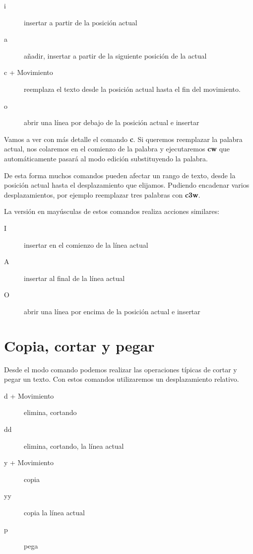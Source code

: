 \begin{description}
    \item[i] insertar a partir de la posición actual
    \item[a] añadir, insertar a partir de la siguiente posición de la actual
    \item[c + Movimiento] reemplaza el texto desde la posición actual hasta el
    fin del movimiento.
    \item[o] abrir una línea por debajo de la posición actual e insertar 
\end{description}

Vamos a ver con más detalle el comando \textbf{c}. Si queremos reemplazar la
palabra actual, nos colaremos en el comienzo de la palabra y ejecutaremos
\textbf{cw} que automáticamente pasará al modo edición substituyendo la
palabra.

De esta forma muchos comandos pueden afectar un rango de texto, desde la
posición actual hasta el desplazamiento que elijamos. Pudiendo encadenar varios
desplazamientos, por ejemplo reemplazar tres palabras con \textbf{c3w}.

La versión en mayúsculas de estos comandos realiza acciones similares:

\begin{description}
    \item[I] insertar en el comienzo de la línea actual
    \item[A] insertar al final de la línea actual
    \item[O] abrir una línea por encima de la posición actual e insertar
\end{description}


\section{Copia, cortar y pegar} %
\label{sec:Copia, cortar y pegar}

Desde el modo comando podemos realizar las operaciones típicas de cortar y
pegar un texto. Con estos comandos utilizaremos un desplazamiento relativo.

\begin{description}
    \item[d + Movimiento] elimina, cortando
    \item[dd] elimina, cortando, la línea actual
    \item[y + Movimiento] copia
    \item[yy] copia la línea actual
    \item[p] pega
\end{description}

